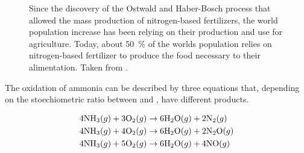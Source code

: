 \begin{figure}[!htb]
\centering
    \caption{
    Since the discovery of the Ostwald and Haber-Bosch process that allowed the mass production of nitrogen-based fertilizers, the world population increase has been relying on their production and use for agriculture.
    Today, about \qty{50}{\percent} of the worlds population relies on nitrogen-based fertilizer to produce the food necessary to their alimentation.
    Taken from \cite{WorldDataFertilizer}.
    }
    \label{fig:FertilizerWID}
\end{figure}

The oxidation of ammonia can be described by three equations that, depending on the stoechiometric ratio between \ammonia and \dioxygen, have different products.

\begin{align}
    \label{eq:AmmoniaOxidationNitrogen}
    4 \ammonia (g) + 3 \dioxygen (g) & \rightarrow 6 \water (g) + 2 \nitrogen (g) \\
    \label{eq:AmmoniaOxidationNitrousOxide}
    4 \ammonia (g) + 4 \dioxygen (g) & \rightarrow 6 \water (g) + 2 \nitrousoxide (g) \\
    \label{eq:AmmoniaOxidationNitricOxide}
    4 \ammonia (g) + 5 \dioxygen (g) & \rightarrow 6 \water (g) + 4 \nitricoxide (g)
\end{align}

